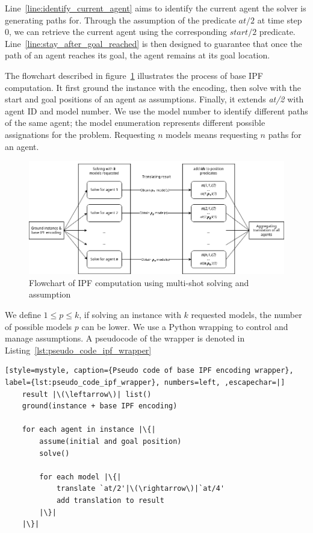 Line~\ref{line:identify_current_agent} aims to identify the current agent the solver is generating paths for. Through the assumption of the predicate \(at/2\) at time step 0, we can retrieve the current agent using the corresponding \(start/2\) predicate. Line~\ref{line:stay_after_goal_reached} is then designed to guarantee that once the path of an agent reaches its goal, the agent remains at its goal location.


The flowchart described in figure~\ref{fig:flowchart_ipf_computation} illustrates the process of base IPF computation. It first ground the instance with the encoding, then solve with the start and goal positions of an agent as assumptions. Finally, it extends \textit{at/2} with agent ID and model number. We use the model number to identify different paths of the same agent; the model enumeration represents different possible assignations for the problem. Requesting \(n\) models means requesting \(n\) paths for an agent.

\begin{figure}[H]
    \centering
    \caption{Flowchart of IPF computation using multi-shot solving and assumption}\label{fig:flowchart_ipf_computation}
    \includegraphics[width=\widthimg]{img/flowchart_ipf_computation.drawio.png}
\end{figure}


We define \(1 \leq p \leq k\), if solving an instance with \(k\) requested models, the number of possible models \(p\) can be lower. 
We use a Python wrapping to control and manage assumptions. A pseudocode of the wrapper is denoted in Listing~\ref{lst:pseudo_code_ipf_wrapper}

\begin{minipage}[H]{\linewidth}
\begin{lstlisting}[style=mystyle, caption={Pseudo code of base IPF encoding wrapper}, label={lst:pseudo_code_ipf_wrapper}, numbers=left, ,escapechar=|]
    result |\(\leftarrow\)| list()
    ground(instance + base IPF encoding)

    for each agent in instance |\{|
        assume(initial and goal position)
        solve()

        for each model |\{|
            translate `at/2'|\(\rightarrow\)|`at/4'
            add translation to result
        |\}|
    |\}|  
\end{lstlisting}
\end{minipage}

